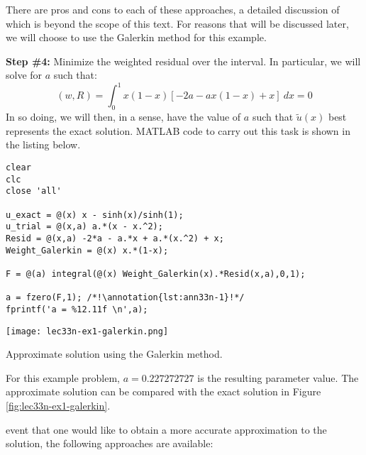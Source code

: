 There are pros and cons to each of these approaches, a detailed discussion of which is beyond the scope of this text.  For reasons that will be discussed later, we will choose to use the Galerkin method for this example.

\vspace{0.25cm}

\noindent\textbf{Step \#4:} Minimize the weighted residual over the interval.  In particular, we will solve for $a$ such that:
\begin{equation*}
\left(w,R\right)=\int_{0}^{1} x(1-x)\left[-2a - ax(1-x) + x\right] \ dx = 0
\end{equation*}
In so doing, we will then, in a sense, have the value of $a$ such that $\tilde{u}(x)$ best represents the exact solution.  MATLAB code to carry out this task is shown in the listing below.
\begin{lstlisting}[style=myMatlab,name=lec33n-ex1]
clear
clc
close 'all'

u_exact = @(x) x - sinh(x)/sinh(1);
u_trial = @(x,a) a.*(x - x.^2);
Resid = @(x,a) -2*a - a.*x + a.*(x.^2) + x;
Weight_Galerkin = @(x) x.*(1-x);

F = @(a) integral(@(x) Weight_Galerkin(x).*Resid(x,a),0,1);

a = fzero(F,1); /*!\annotation{lst:ann33n-1}!*/
fprintf('a = %12.11f \n',a);
\end{lstlisting}
\begin{marginfigure}
\texttt{[image: lec33n-ex1-galerkin.png]}
\caption{Approximate solution using the Galerkin method.}
\label{fig:lec33n-ex1-galerkin}
\end{marginfigure}
For this example problem, $a = 0.227272727$ is the resulting parameter value.  The approximate solution can be compared with the exact solution in Figure \ref{fig:lec33n-ex1-galerkin}.  

 event that one would like to obtain a more accurate approximation to the solution, the following approaches are available:


